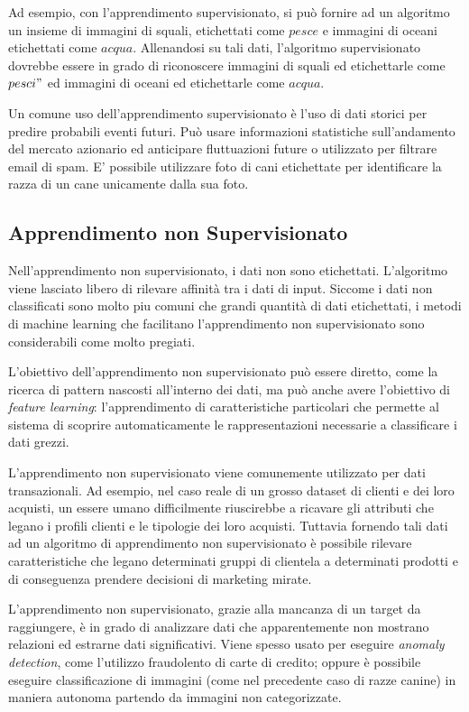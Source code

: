 Ad esempio, con l'apprendimento supervisionato, si può fornire ad un algoritmo un insieme di immagini di squali, etichettati come $pesce$ e immagini di oceani etichettati come $acqua$. Allenandosi su tali dati, l'algoritmo supervisionato dovrebbe essere in grado di riconoscere immagini di squali ed etichettarle come $pesci"$ ed immagini di oceani ed etichettarle come $acqua$.

Un comune uso dell'apprendimento supervisionato è l'uso di dati storici per predire probabili eventi futuri. Può usare informazioni statistiche sull'andamento del mercato azionario ed anticipare fluttuazioni future o utilizzato per filtrare email di spam. E' possibile utilizzare foto di cani etichettate per identificare la razza di un cane unicamente dalla sua foto.

\subsection{Apprendimento non Supervisionato}
Nell'apprendimento non supervisionato, i dati non sono etichettati. L'algoritmo viene lasciato libero di rilevare affinità tra i dati di input. Siccome i dati non classificati sono molto piu comuni che grandi quantità di dati etichettati, i metodi di machine learning che facilitano l'apprendimento non supervisionato sono considerabili come molto pregiati.

L'obiettivo dell'apprendimento non supervisionato può essere diretto, come la ricerca di pattern nascosti all'interno dei dati, ma può anche avere l'obiettivo di \textit{feature learning}: l'apprendimento di caratteristiche particolari che permette al sistema di scoprire automaticamente le rappresentazioni necessarie a classificare i dati grezzi.

L'apprendimento non supervisionato viene comunemente utilizzato per dati transazionali. Ad esempio, nel caso reale di un grosso dataset di clienti e dei loro acquisti, un essere umano difficilmente riuscirebbe a ricavare gli attributi che legano i profili clienti e le tipologie dei loro acquisti. Tuttavia fornendo tali dati ad un algoritmo di  apprendimento non supervisionato è possibile rilevare caratteristiche che legano determinati gruppi di clientela a determinati prodotti e di conseguenza prendere decisioni di marketing mirate.

L'apprendimento non supervisionato, grazie alla mancanza di un target da raggiungere, è in grado di analizzare dati che   apparentemente non mostrano relazioni ed estrarne dati significativi. Viene spesso usato per eseguire \textit{anomaly detection}, come l'utilizzo fraudolento di carte di credito; oppure è possibile eseguire classificazione di immagini (come nel precedente caso di razze canine) in maniera autonoma partendo da immagini non categorizzate.

